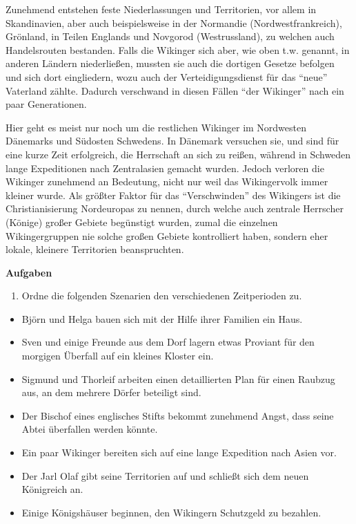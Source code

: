 \documentclass[12pt,a4paper,ngerman,openany]{book}
\newcommand{\aufgaben}[1]{
  \begin{tcolorbox}
    \textbf{Aufgaben}
    \begin{enumerate}
      #1
    \end{enumerate}
  \end{tcolorbox}
}
\begin{document}
\begin{tcolorbox}[sharp corners, title=Ungefähr 900 bis 980]
Zunehmend entstehen feste Niederlassungen und Territorien, vor allem in Skandinavien, aber auch beispielsweise in der Normandie (Nordwestfrankreich), Grönland, in Teilen Englands und Novgorod (Westrussland), zu welchen auch Handelsrouten bestanden. Falls die Wikinger sich aber, wie oben t.w. genannt, in anderen Ländern niederließen, mussten sie auch die dortigen Gesetze befolgen und sich dort eingliedern, wozu auch der Verteidigungsdienst für das “neue” Vaterland zählte. Dadurch verschwand in diesen Fällen “der Wikinger” nach ein paar Generationen.
\end{tcolorbox}

\begin{tcolorbox}[sharp corners, title=Ungefähr 980 bis 1066]
Hier geht es meist nur noch um die restlichen Wikinger im Nordwesten Dänemarks und Südosten Schwedens. In Dänemark versuchen sie, und sind für eine kurze Zeit erfolgreich, die Herrschaft an sich zu reißen, während in Schweden lange Expeditionen nach Zentralasien gemacht wurden. Jedoch verloren die Wikinger zunehmend an Bedeutung, nicht nur weil das Wikingervolk immer kleiner wurde. Als größter Faktor für das “Verschwinden” des Wikingers ist die Christianisierung Nordeuropas zu nennen, durch welche auch zentrale Herrscher (Könige) großer Gebiete begünstigt wurden, zumal die einzelnen Wikingergruppen nie solche großen Gebiete kontrolliert haben, sondern eher lokale, kleinere Territorien beanspruchten.
\end{tcolorbox}

\vspace{0.66cm}

\aufgaben{
  \item Ordne die folgenden Szenarien den verschiedenen Zeitperioden zu.
}

\begin{itemize}
\item Björn und Helga bauen sich mit der Hilfe ihrer Familien ein Haus.
\item Sven und einige Freunde aus dem Dorf lagern etwas Proviant für den morgigen Überfall auf ein kleines Kloster ein.
\item Sigmund und Thorleif arbeiten einen detaillierten Plan für einen Raubzug aus, an dem mehrere Dörfer beteiligt sind.
\item Der Bischof eines englisches Stifts bekommt zunehmend Angst, dass seine Abtei überfallen werden könnte.
\item Ein paar Wikinger bereiten sich auf eine lange Expedition nach Asien vor.
\item Der Jarl Olaf gibt seine Territorien auf und schließt sich dem neuen Königreich an.
\item Einige Königshäuser beginnen, den Wikingern Schutzgeld zu bezahlen.
\end{itemize}
\end{document}
